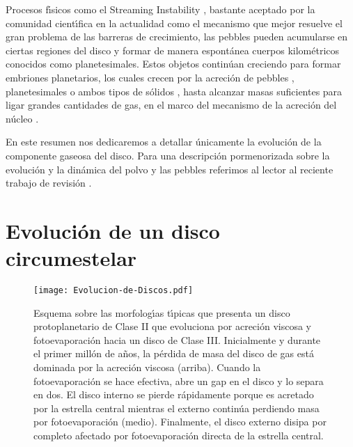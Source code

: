\documentclass[baaa]{baaa}
\begin{document}
Procesos f\'{\i}sicos como el Streaming Instability \citep{YoudinGoodman2005,Johansen2007}, bastante aceptado por la comunidad cient\'{\i}fica en la actualidad como el mecanismo que mejor resuelve el gran problema de las barreras de crecimiento, las pebbles pueden acumularse en ciertas regiones del disco y formar de manera espont\'anea cuerpos kilométricos conocidos como planetesimales. Estos objetos contin\'uan creciendo para formar embriones planetarios, los cuales crecen por la acreci\'on de pebbles \citep{Ormel10,JohansenLambrechts2017}, planetesimales \citep{Mordasini2009, Ronco2017} o ambos tipos de s\'olidos \citep{Alibert2018, Guilera2020}, hasta alcanzar masas suficientes para ligar grandes cantidades de gas, en el marco del mecanismo de la acreci\'on del n\'ucleo \citep{Pollack1996, Guilera2010, Guilera2020}. 

En este resumen nos dedicaremos a detallar \'unicamente la evoluci\'on de la componente gaseosa del disco. Para una descripci\'on pormenorizada sobre la evoluci\'on y la din\'amica del polvo y las pebbles referimos al lector al reciente trabajo de revisi\'on \citet{Birnstiel2023}.

\section{Evoluci\'on de un disco circumestelar}\label{Evolucion}

\begin{figure}[!t]
\centering
\texttt{[image: Evolucion-de-Discos.pdf]}
\caption{Esquema sobre las morfolog\'{\i}as t\'{\i}picas que presenta un disco protoplanetario de Clase II que evoluciona por acreci\'on viscosa y fotoevaporaci\'on hacia un disco de Clase III. Inicialmente y durante el primer mill\'on de a\~nos, la p\'erdida de masa del disco de gas est\'a dominada por la acreci\'on viscosa (arriba). Cuando la fotoevaporaci\'on se hace efectiva, abre un gap en el disco y lo separa en dos. El disco interno se pierde r\'apidamente porque es acretado por la estrella central mientras el externo contin\'ua perdiendo masa por fotoevaporaci\'on (medio). Finalmente, el disco externo disipa por completo afectado por fotoevaporaci\'on directa de la estrella central.}
\label{Evolucion}
\end{figure}
\end{document}
